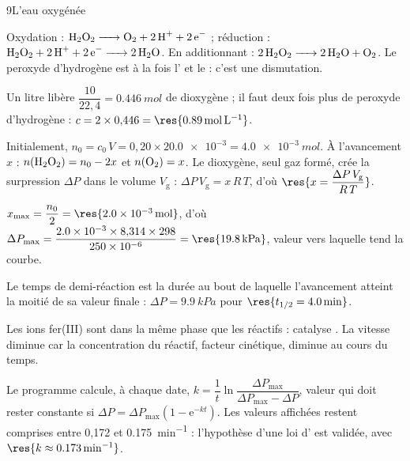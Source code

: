 

\begin{corrigeBac}{9}{L'eau oxygénée}
\begin{questions}
\item Oxydation : $\ce{H2O2 -> O2 + 2H+ + 2e-}$ ; réduction : $\ce{H2O2 + 2H+ + 2e- -> 2H2O}$. En additionnant :
$\ce{2H2O2 -> 2H2O + O2}$. Le peroxyde d'hydrogène est à la fois l' et le  : c'est une
dismutation. \pts{1 pt}
\item Un litre libère $\dfrac{10}{22{,}4}=\qty{0,446}{mol}$ de dioxygène ; il faut deux fois plus de peroxyde d'hydrogène :
$c=2\times0{,}446=\res{\qty{0,89}{mol.L^{-1}}}$. 
\end{questions}
\begin{questions}[resume]
\item Initialement, $n_0=c_0\,V=0{,}20\times\num{20.0e-3}=\qty{4,0e-3}{mol}$. À l'avancement $x$ : $n(\ce{H2O2})=n_0-2x$ et $n(\ce{O2})=x$. Le dioxygène,
seul gaz formé, crée la surpression $\Delta P$ dans le volume $V_\mathrm{g}$ : $\Delta P\,V_\mathrm{g}=x\,R\,T$, d'où $\res{x=\dfrac{\Delta P\,V_\mathrm{g}}{R\,T}}$. 
\item $x_\mathrm{max}=\dfrac{n_0}{2}=\res{\qty{2,0e-3}{mol}}$, d'où $\Delta P_\mathrm{max}=\dfrac{\num{2.0e-3}\times8{,}314\times298}{\num{250e-6}}=\res{\qty{19,8}{kPa}}$, valeur vers
laquelle tend la courbe. 
\item Le temps de demi-réaction est la durée au bout de laquelle l'avancement atteint la moitié de sa valeur finale :
$\Delta P=\qty{9,9}{kPa}$ pour $\res{t_{1/2}=\qty{4,0}{min}}$. 
\item Les ions fer(III) sont dans la même phase que les réactifs : catalyse . La vitesse diminue car la
concentration du réactif, facteur cinétique, diminue au cours du temps. 
\item Le programme calcule, à chaque date, $k=\dfrac1t\ln\dfrac{\Delta P_\mathrm{max}}{\Delta P_\mathrm{max}-\Delta P}$, valeur qui doit rester constante si
$\Delta P=\Delta P_\mathrm{max}\left(1-\mathrm{e}^{-kt}\right)$. Les valeurs affichées restent comprises entre 0,172 et \qty{0,175}{min^{-1}} : l'hypothèse
d'une loi d' est validée, avec $\res{k\approx\qty{0,173}{min^{-1}}}$. 

\end{questions}
\end{corrigeBac}
